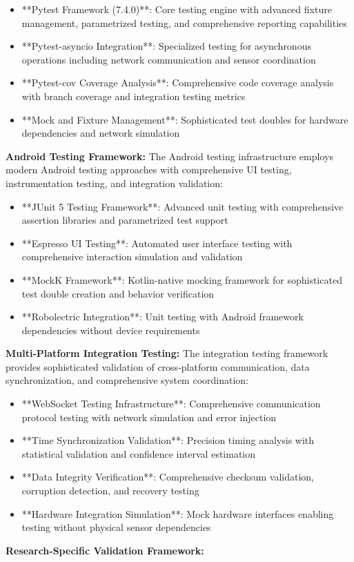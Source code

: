 \documentclass[12pt,a4paper]{article}
\begin{document}
\begin{itemize}
\item **Pytest Framework (7.4.0)**: Core testing engine with advanced fixture management, parametrized testing, and
  comprehensive reporting capabilities
\item **Pytest-asyncio Integration**: Specialized testing for asynchronous operations including network communication and
  sensor coordination
\item **Pytest-cov Coverage Analysis**: Comprehensive code coverage analysis with branch coverage and integration testing
  metrics
\item **Mock and Fixture Management**: Sophisticated test doubles for hardware dependencies and network simulation

\end{itemize}
\textbf{Android Testing Framework:}
The Android testing infrastructure employs modern Android testing approaches with comprehensive UI testing,
instrumentation testing, and integration validation:

\begin{itemize}
\item **JUnit 5 Testing Framework**: Advanced unit testing with comprehensive assertion libraries and parametrized test
  support
\item **Espresso UI Testing**: Automated user interface testing with comprehensive interaction simulation and validation
\item **MockK Framework**: Kotlin-native mocking framework for sophisticated test double creation and behavior verification
\item **Robolectric Integration**: Unit testing with Android framework dependencies without device requirements

\end{itemize}
\textbf{Multi-Platform Integration Testing:}
The integration testing framework provides sophisticated validation of cross-platform communication, data
synchronization, and comprehensive system coordination:

\begin{itemize}
\item **WebSocket Testing Infrastructure**: Comprehensive communication protocol testing with network simulation and error
  injection
\item **Time Synchronization Validation**: Precision timing analysis with statistical validation and confidence interval
  estimation
\item **Data Integrity Verification**: Comprehensive checksum validation, corruption detection, and recovery testing
\item **Hardware Integration Simulation**: Mock hardware interfaces enabling testing without physical sensor dependencies

\end{itemize}
\textbf{Research-Specific Validation Framework:}
\end{document}
